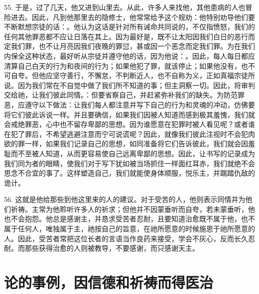 55. 于是，过了几天，他又进到山里去。从此，许多人来找他，其他患病的人也冒险进去。因此，凡到他那里去的隐修士，他常常给予这个规劝：他特别劝导他们要不断默想宗徒的话：。他认为这话是针对所有诫命共同说的，不仅指愤怒，我们的任何其他罪恶都不应让日落在其上。因为最好是，既不让太阳因我们白日的恶行而定我们罪，也不让月亮因我们夜晚的罪愆，甚或因一个恶念而定我们罪。为在我们内保全这种状态，最好听从宗徒并遵守他的话，因为他说：。因此，每人每日都应清算自己白天的行为和夜间的行为；如果他犯了罪，就该停止；如果他没有，也不可自夸。但他应坚守善行，不懈怠，不判断近人，也不自称为义，正如真福宗徒所说。因为我们常在不自觉中做了我们所不知道的事；但主洞察一切。因此，将审判交给祂，让我们彼此同情。：但要省察自己，并赶紧弥补我们的缺失。为防范罪恶，应遵守以下做法：让我们每人都注意并写下自己的行为和灵魂的冲动，仿佛要将它们彼此诉说一样。并且要确信，如果我们因被人知道而感到极其羞愧，我们就会戒绝罪恶，心中也不留存卑鄙的思想。因为谁愿意在犯罪时被人看见呢？或者谁在犯了罪后，不希望逃避注意而宁可说谎呢？因此，就像我们彼此注视时不会犯肉欲的罪一样，如果我们记录自己的思想，如同准备将它们告诉彼此，我们就会因羞耻而不至被人知道，从而更容易使自己远离卑鄙的思想。因此，让书写的记录成为我们同为者的眼睛，使我们对于写下犹如被当场抓住一样面红耳赤，我们就绝不会思念不合宜的事了。这样塑造自己，我们就能使身体顺服，悦乐主，并踹踏仇敌的诡计。\par

56. 这就是他给那些到他这里来的人的建议。对于受苦的人，他则表示同情并为他们祈祷。主常为他聆听许多人的祈求；但他并不因蒙垂听而自夸，若未蒙垂听，他也不会抱怨。他总是感谢主，并恳求受苦者忍耐，且要知道治愈既不属于他，也不属于任何人，唯独属于主，祂按自己的旨意，在祂所愿意的时候施恩于祂所愿意的人。因此，受苦者常把这位长者的言语当作良药来接受，学会不灰心，反而长久忍耐。而那些获得治愈的人则被教导，不要感谢，而只感谢天主。\par


\section{论的事例，因信德和祈祷而得医治}

